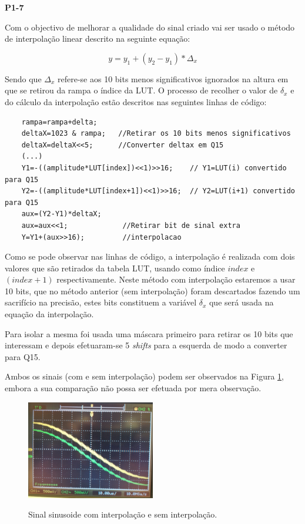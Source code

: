 \documentclass[11pt]{article}
\begin{document}
\textbf{P1-7}
\label{para:P1-7}

Com o objectivo de melhorar a qualidade do sinal criado vai ser usado o método de interpolação linear descrito na seguinte equação:

\begin{equation}
y=y_{1}+(y_{2}-y_{1})*\Delta_{x}
\end{equation}

Sendo que $ \Delta_{x} $ refere-se aos 10 bits menos significativos ignorados na altura em que se retirou da rampa o índice da LUT. O processo de recolher o valor de $ \delta_{x} $ e do cálculo da interpolação estão descritos nas seguintes linhas de código:

\begin{lstlisting}
	rampa=rampa+delta;
	deltaX=1023 & rampa;   //Retirar os 10 bits menos significativos
	deltaX=deltaX<<5;      //Converter deltax em Q15
	(...)
	Y1=-((amplitude*LUT[index])<<1)>>16;	// Y1=LUT(i) convertido para Q15
	Y2=-((amplitude*LUT[index+1])<<1)>>16;	// Y2=LUT(i+1) convertido para Q15
	aux=(Y2-Y1)*deltaX;		
	aux=aux<<1;				//Retirar bit de sinal extra
	Y=Y1+(aux>>16);			//interpolacao	
\end{lstlisting}

Como se pode observar nas linhas de código, a interpolação é realizada com dois valores que são retirados da tabela LUT, usando como índice $\textit{index}$ \hspace{0,1 mm} e $(\textit{index}+1)$ respectivamente. Neste método com interpolação estaremos a usar 10 bits, que no método anterior (sem interpolação) foram descartados fazendo um sacrifício na precisão,  estes bits constituem a variável $ \delta_{x} $ que será usada na equação da interpolação.

Para isolar a mesma foi usada uma máscara primeiro para retirar os 10 bits que interessam e depois efetuaram-se 5 \textit{shifts} para a esquerda de modo a converter para Q15.

Ambos os sinais (com e sem interpolação) podem ser observados na Figura \ref{fig:interp}, embora a sua comparação não possa ser efetuada por mera observação.

\begin{figure}[H]
	\centering
	\includegraphics[width=0.5\textwidth]{./P1_interp}~\\
	\caption{Sinal sinusoide com interpolação e sem interpolação.}
	\label{fig:interp}
\end{figure}
\end{document}
